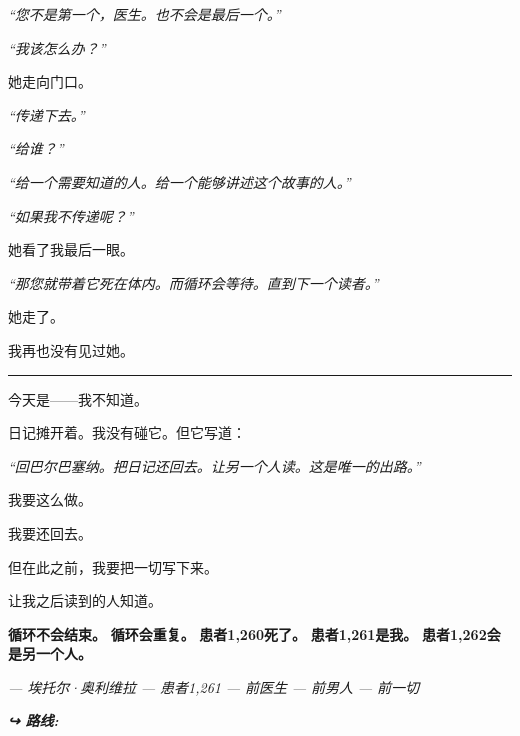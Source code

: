 \noindent \textit{“您不是第一个，医生。也不会是最后一个。”}

\noindent \textit{“我该怎么办？”}

\noindent 她走向门口。

\noindent \textit{“传递下去。”}

\noindent \textit{“给谁？”}

\noindent \textit{“给一个需要知道的人。给一个能够讲述这个故事的人。”}

\noindent \textit{“如果我不传递呢？”}

\noindent 她看了我最后一眼。

\noindent \textit{“那您就带着它死在体内。而循环会等待。直到下一个读者。”}

\noindent 她走了。

\noindent 我再也没有见过她。

\vspace{0.5em}\noindent\rule{\textwidth}{0.5pt}\vspace{0.5em}

\noindent 今天是——我不知道。

\noindent 日记摊开着。我没有碰它。但它写道：

\noindent \textit{“回巴尔巴塞纳。把日记还回去。让另一个人读。这是唯一的出路。”}

\noindent 我要这么做。

\noindent 我要还回去。

\noindent 但在此之前，我要把一切写下来。

\noindent 让我之后读到的人知道。

\noindent \textbf{循环不会结束。}
\textbf{循环会重复。}
\textbf{患者1,260死了。}
\textbf{患者1,261是我。}
\textbf{患者1,262会是另一个人。}

\noindent \textit{--- 埃托尔·奥利维拉}
\textit{--- 患者1,261}
\textit{--- 前医生}
\textit{--- 前男人}
\textit{--- 前一切}

\vspace{0.5em}
\noindent\textit{\textbf{↪ 路线:}  \rotasep {} \rotasep {}}
